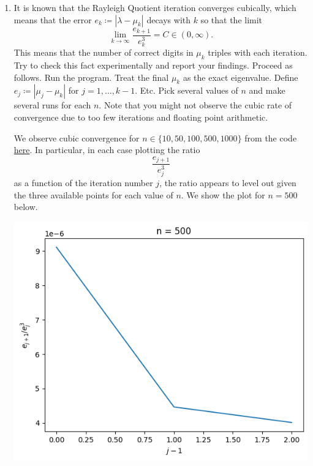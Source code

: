 \documentclass{../../../kin_math}
\begin{document}
\begin{questions}
\begin{enumerate}
    \item It is known that the Rayleigh Quotient iteration converges cubically, which means that the error $e_k \coloneqq |\lambda - \mu_k|$ decays with $k$ so that the limit
    \begin{equation*}
      \lim_{k \to \infty} \frac{e_{k + 1}}{e_k^3} = C \in (0, \infty).
    \end{equation*}
    This means that the number of correct digits in $\mu_k$ triples with each iteration. Try to check this fact experimentally and report your findings. Proceed as follows. Run the program. Treat the final $\mu_k$ as the exact eigenvalue. Define $e_j \coloneqq |\mu_j - \mu_k|$ for $j = 1, \dots, k - 1$. Etc. Pick several values of $n$ and make several runs for each $n$. Note that you might not observe the cubic rate of convergence due to too few iterations and floating point arithmetic.
    \begin{solution}
      We observe cubic convergence for $n \in \{10, 50, 100, 500, 1000\}$ from the code \href{https://github.com/elijahkin/school/blob/main/umd/amsc660/hw4.ipynb}{here}. In particular, in each case plotting the ratio
      \begin{equation*}
        \frac{e_{j + 1}}{e_j^3}
      \end{equation*}
      as a function of the iteration number $j$, the ratio appears to level out given the three available points for each value of $n$. We show the plot for $n = 500$ below.
      \begin{center}
        \includegraphics[scale=0.7]{cubic500.png}
      \end{center}
    \end{solution}
  \end{enumerate}
\end{questions}
\end{document}
